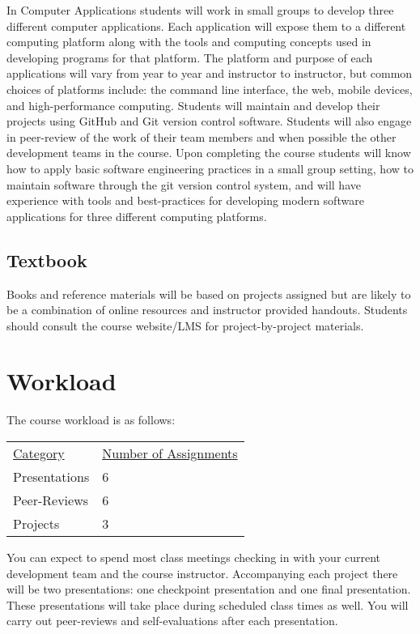 \documentclass[10pt]{article}
\begin{document}
In Computer Applications students will work in small groups to develop three different computer applications.  Each application will expose them to a different computing platform along with the tools and computing concepts used in developing programs for that platform. The platform and purpose of each applications will vary from year to year and instructor to instructor, but common choices of platforms include: the command line interface, the web, mobile devices, and high-performance computing. Students will maintain and develop their projects using GitHub and Git version control software. Students will also engage in peer-review of the work of their team members and when possible the other development teams in the course. Upon completing the course students will know how to apply basic software engineering practices in a small group setting, how to maintain software through the git version control system, and will have experience with tools and best-practices for developing modern software applications for three different computing platforms.

\subsection{Textbook}

Books and reference materials will be based on projects assigned but are likely to be a combination of online resources and instructor provided handouts.  Students should consult the course website/LMS for project-by-project materials.

\section{Workload}

The course workload is as follows:
\begin{center}
  \begin{tabular}{ll}
    \underline{Category} & \underline{Number of Assignments} \\
    Presentations & 6 \\
    Peer-Reviews & 6 \\
    Projects & 3 \\
  \end{tabular}
\end{center}

You can expect to spend most class meetings checking in with your current development team and the course instructor. Accompanying each project there will be two presentations: one checkpoint presentation and one final presentation. These presentations will take place during scheduled class times as well. You will carry out peer-reviews and self-evaluations after each presentation.
\end{document}
